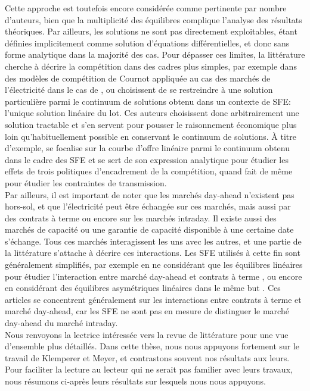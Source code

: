 Cette approche est toutefois encore considérée comme pertinente par nombre d'auteurs, bien que la multiplicité des équilibres complique l'analyse des résultats théoriques. Par ailleurs, les solutions ne sont pas directement exploitables, étant définies implicitement comme solution d'équations différentielles, et donc sans forme analytique dans la majorité des cas. Pour dépasser ces limites, la littérature cherche à décrire la compétition dans des cadres plus simples, par exemple dans des modèles de compétition de Cournot appliquée au cas des marchés de l'électricité dans le cas de \cite{borenstein1999empirical}, ou choisissent de se restreindre à une solution particulière parmi le continuum de solutions obtenu dans un contexte de SFE: l'unique solution linéaire du lot. Ces auteurs choisissent donc arbitrairement une solution tractable et s'en servent pour pousser le raisonnement économique plus loin qu'habituellement possible en conservant le continuum de solutions. \`A titre d'exemple, \cite{green1996increasing} se focalise sur la courbe d'offre linéaire parmi le continuum obtenu dans le cadre des SFE et se sert de son expression analytique pour étudier les effets de trois politiques d'encadrement de la compétition, quand \cite{hobbs2000strategic} fait de même pour étudier les contraintes de transmission. \\

Par ailleurs, il est important de noter que les marchés day-ahead n'existent pas hors-sol, et que l'électricité peut être échangée sur ces marchés, mais aussi par des contrats à terme ou encore sur les marchés intraday. Il existe aussi des marchés de capacité ou une garantie de capacité disponible à une certaine date s'échange. Tous ces marchés interagissent les uns avec les autres, et une partie de la littérature s'attache à décrire ces interactions. Les SFE utilisés à cette fin sont généralement simplifiés, par exemple en ne considérant que les équilibres linéaires pour étudier l'interaction entre marché day-ahead et contrats à terme \cite{green1999electricity}, ou encore en considérant des équilibres asymétriques linéaires dans le même but \cite{anderson2012asymmetric}. Ces articles se concentrent généralement sur les interactions entre contrats à terme et marché day-ahead, car les SFE ne sont pas en mesure de distinguer le marché day-ahead du marché intraday.\\

Nous renvoyons la lectrice intéressée vers la revue de littérature \cite{ventosa2005electricity} pour une vue d'ensemble plus détaillés. Dans cette thèse, nous nous appuyons fortement sur le travail de Klemperer et Meyer, et contrastons souvent nos résultats aux leurs. Pour faciliter la lecture au lecteur qui ne serait pas familier avec leurs travaux, nous résumons ci-après leurs résultats sur lesquels nous nous appuyons. 

